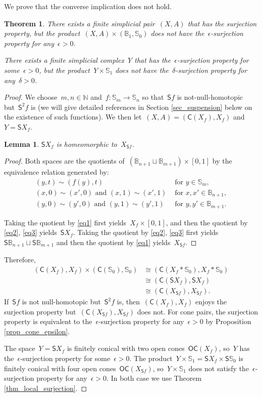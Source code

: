 \documentclass[english,11pt]{article}
\theoremstyle{plain}
\newtheorem{theorem}{Theorem}[section]
\newtheorem{lemma}{Lemma}[section]
\theoremstyle{remark}
\theoremstyle{definition}
\newcommand{\Sp}{\mathbb{S}}
\newcommand{\BB}{\mathbb{B}}
\newcommand{\N}{\mathbb{N}}
\newcommand{\C}[1]{\mathsf{C}(#1)}%
\newcommand{\OC}[1]{\mathsf{OC}(#1)}%
\newcommand{\sus}{\mathsf{S}}
\begin{document}
We prove that the converse implication does not hold.
\begin{theorem}\label{thm_product_counterexample}
There exists a finite simplicial pair~$(X,A)$ that has the surjection property, but the product~$(X,A)\times (\BB_1,\Sp_0)$ does not have the~$\epsilon$-surjection property for any~$\epsilon>0$.

There exists a finite simplicial complex~$Y$ that has the~$\epsilon$-surjection property for some~$\epsilon>0$, but the product~$Y\times \Sp_1$ does not have the~$\delta$-surjection property for any~$\delta>0$.
\end{theorem}

\begin{proof}
We choose~$m,n\in\N$ and~$f:\Sp_m\to\Sp_n$ so that~$\sus f$ is not-null-homotopic but~$\sus^2 f$ is (we will give detailed references in Section \ref{sec_suspension} below on the existence of such functions). We then let~$(X,A)=(\C{X_f},X_f)$ and~$Y=\sus X_f$.

\begin{lemma}
$\sus X_f$ is homeomorphic to~$X_{\sus f}$.
\end{lemma}
\begin{proof}
Both spaces are the quotients of~$(\BB_{n+1}\sqcup\BB_{m+1})\times [0,1]$ by the equivalence relation generated by:
\begin{align}
(y,t)\sim (f(y),t)&\text{ for }y\in\Sp_m,\label{eq1}\\
(x,0)\sim (x',0)\text{ and }(x,1)\sim (x',1)&\text{ for }x,x'\in\BB_{n+1},\label{eq2}\\
(y,0)\sim(y',0)\text{ and }(y,1)\sim(y',1)&\text{ for }y,y'\in\BB_{m+1}.\label{eq3}
\end{align}

Taking the quotient by \eqref{eq1} first yields~$X_f\times [0,1]$, and then the quotient by \eqref{eq2}, \eqref{eq3} yields~$\sus X_f$. Taking the quotient by \eqref{eq2}, \eqref{eq3} first yields~$\sus\BB_{n+1}\sqcup\sus \BB_{m+1}$ and then the quotient by \eqref{eq1} yields~$X_{\sus f}$.
\end{proof}

Therefore,
\begin{align*}
(\C{X_f},X_f)\times (\C{\Sp_0},\Sp_0)&\cong (\C{X_f*\Sp_0},X_f*\Sp_0)\\
&\cong(\C{\sus X_f},\sus X_f)\\
&\cong(\C{X_{\sus f}},X_{\sus f}).
\end{align*}
If~$\sus f$ is not null-homotopic but~$\sus^2 f$ is, then~$(\C{X_f},X_f)$ enjoys the surjection property but~$(\C{X_{\sus f}},X_{\sus f})$ does not. For cone pairs, the surjection property is equivalent to the~$\epsilon$-surjection property for any~$\epsilon>0$ by Proposition \ref{prop_cone_epsilon}.

The space~$Y=\sus X_f$ is finitely conical with two open cones~$\OC{X_f}$, so~$Y$ has the~$\epsilon$-surjection property for some~$\epsilon>0$. The product~$Y\times\Sp_1=\sus X_f\times \sus \Sp_0$ is finitely conical with four open cones~$\OC{X_{\sus f}}$, so~$Y\times \Sp_1$ does not satisfy the~$\epsilon$-surjection property for any~$\epsilon>0$. In both case we use Theorem \ref{thm_local_surjection}.
\end{proof}
\end{document}
